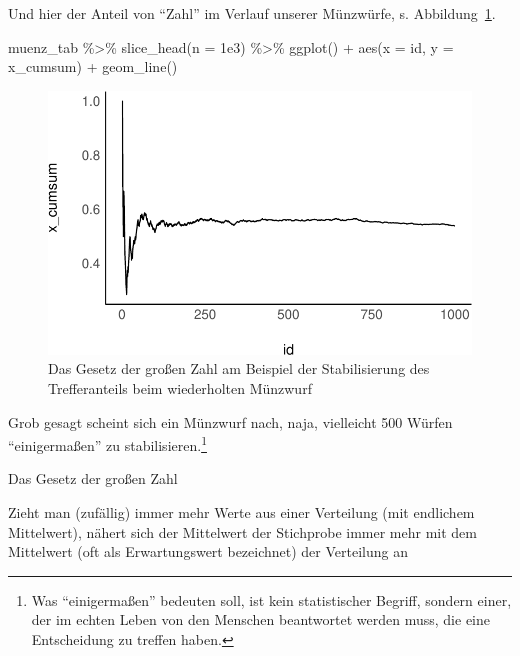 \documentclass[
  a4paper,
  DIV=11]{scrreprt}
\newenvironment{Shaded}{\begin{snugshade}}{\end{snugshade}}
\newcommand{\AttributeTok}[1]{\textcolor[rgb]{0.40,0.45,0.13}{#1}}
\newcommand{\FloatTok}[1]{\textcolor[rgb]{0.68,0.00,0.00}{#1}}
\newcommand{\FunctionTok}[1]{\textcolor[rgb]{0.28,0.35,0.67}{#1}}
\newcommand{\NormalTok}[1]{\textcolor[rgb]{0.00,0.23,0.31}{#1}}
\newcommand{\SpecialCharTok}[1]{\textcolor[rgb]{0.37,0.37,0.37}{#1}}
\theoremstyle{definition}
\theoremstyle{remark}
\begin{document}
Und hier der Anteil von ``Zahl'' im Verlauf unserer Münzwürfe, s.
Abbildung~\ref{fig-lln}.

\begin{Shaded}
\begin{Highlighting}[]
\NormalTok{muenz\_tab }\SpecialCharTok{\%\textgreater{}\%} 
  \FunctionTok{slice\_head}\NormalTok{(}\AttributeTok{n =} \FloatTok{1e3}\NormalTok{) }\SpecialCharTok{\%\textgreater{}\%} 
  \FunctionTok{ggplot}\NormalTok{() }\SpecialCharTok{+}
  \FunctionTok{aes}\NormalTok{(}\AttributeTok{x =}\NormalTok{ id, }\AttributeTok{y =}\NormalTok{ x\_cumsum) }\SpecialCharTok{+}
  \FunctionTok{geom\_line}\NormalTok{()}
\end{Highlighting}
\end{Shaded}

\begin{figure}[H]

{\centering \includegraphics{./Verteilungen_files/figure-pdf/fig-lln-1.pdf}

}

\caption{\label{fig-lln}Das Gesetz der großen Zahl am Beispiel der
Stabilisierung des Trefferanteils beim wiederholten Münzwurf}

\end{figure}

Grob gesagt scheint sich ein Münzwurf nach, naja, vielleicht 500 Würfen
``einigermaßen'' zu stabilisieren.\footnote{Was ``einigermaßen''
  bedeuten soll, ist kein statistischer Begriff, sondern einer, der im
  echten Leben von den Menschen beantwortet werden muss, die eine
  Entscheidung zu treffen haben.}

\begin{tcolorbox}[enhanced jigsaw, leftrule=.75mm, left=2mm, bottomrule=.15mm, opacityback=0, coltitle=black, colbacktitle=quarto-callout-important-color!10!white, opacitybacktitle=0.6, rightrule=.15mm, toptitle=1mm, colback=white, colframe=quarto-callout-important-color-frame, arc=.35mm, toprule=.15mm, breakable, titlerule=0mm, bottomtitle=1mm, title=\textcolor{quarto-callout-important-color}{\faExclamation}\hspace{0.5em}{Wichtig}]
Das Gesetz der großen Zahl

Zieht man (zufällig) immer mehr Werte aus einer Verteilung (mit
endlichem Mittelwert), nähert sich der Mittelwert der Stichprobe immer
mehr mit dem Mittelwert (oft als Erwartungswert bezeichnet) der
Verteilung an
\end{tcolorbox}
\end{document}
